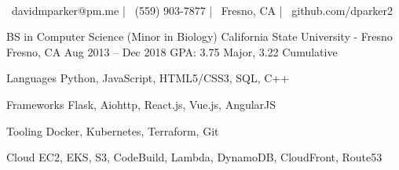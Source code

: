 \documentclass[]{awesome-cv}
\begin{document}
    
\begin{center}
	  \\
	\vspace{2mm}
	{\faEnvelope\ davidmparker@pm.me} | {\faMobile\ (559) 903-7877} | {\faMapMarker\ Fresno, CA} | {\faLink\ github.com/dparker2}
\end{center}
\begin{cventries}
	\cventry
	{BS in Computer Science (Minor in Biology)}
	{California State University - Fresno}
	{Fresno, CA}
	{Aug 2013 – Dec 2018}
	{GPA: 3.75 Major, 3.22 Cumulative}
\end{cventries}

\vspace{-2mm}
\begin{cvskills}
	\cvskill
	{Languages}
	{Python, JavaScript, HTML5/CSS3, SQL, C++}

	\cvskill
	{Frameworks}
	{Flask, Aiohttp, React.js, Vue.js, AngularJS}

	\cvskill
	{Tooling}
	{Docker, Kubernetes, Terraform, Git}

	\cvskill
	{Cloud}
	{EC2, EKS, S3, CodeBuild, Lambda, DynamoDB, CloudFront, Route53}
\end{cvskills}
\end{document}
